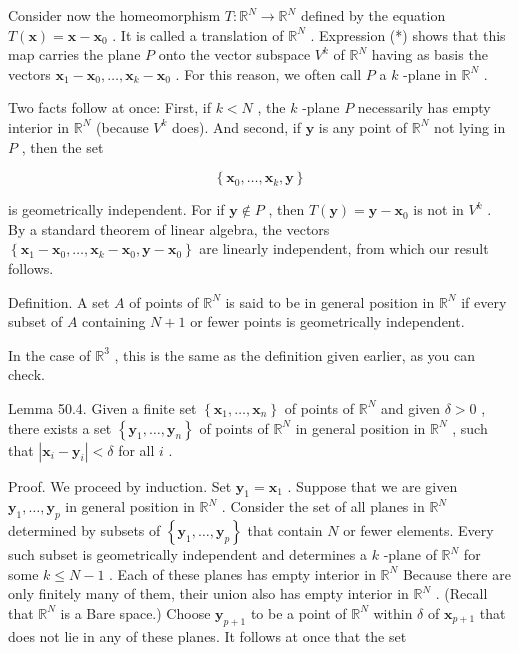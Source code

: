 Consider now the homeomorphism \(T : {\mathbb{R}}^{N} \rightarrow  {\mathbb{R}}^{N}\) defined by the equation \(T\left( \mathbf{x}\right)  = \mathbf{x} - {\mathbf{x}}_{0}\) . It is called a translation of \({\mathbb{R}}^{N}\) . Expression (*) shows that this map carries the plane \(P\) onto the vector subspace \({V}^{k}\) of \({\mathbb{R}}^{N}\) having as basis the vectors \({\mathbf{x}}_{1} - {\mathbf{x}}_{0},\ldots ,{\mathbf{x}}_{k} - {\mathbf{x}}_{0}\) . For this reason, we often call \(P\) a \(k\) -plane in \({\mathbb{R}}^{N}\) .

Two facts follow at once: First, if \(k < N\) , the \(k\) -plane \(P\) necessarily has empty interior in \({\mathbb{R}}^{N}\) (because \({V}^{k}\) does). And second, if \(\mathbf{y}\) is any point of \({\mathbb{R}}^{N}\) not lying in \(P\) , then the set

\[
\left\{  {{\mathbf{x}}_{0},\ldots ,{\mathbf{x}}_{k},\mathbf{y}}\right\}
\]

is geometrically independent. For if \(\mathbf{y} \notin  P\) , then \(T\left( \mathbf{y}\right)  = \mathbf{y} - {\mathbf{x}}_{0}\) is not in \({V}^{k}\) . By a standard theorem of linear algebra, the vectors \(\left\{  {{\mathbf{x}}_{1} - {\mathbf{x}}_{0},\ldots ,{\mathbf{x}}_{k} - {\mathbf{x}}_{0},\mathbf{y} - {\mathbf{x}}_{0}}\right\}\) are linearly independent, from which our result follows.

Definition. A set \(A\) of points of \({\mathbb{R}}^{N}\) is said to be in general position in \({\mathbb{R}}^{N}\) if every subset of \(A\) containing \(N + 1\) or fewer points is geometrically independent.

In the case of \({\mathbb{R}}^{3}\) , this is the same as the definition given earlier, as you can check.

Lemma 50.4. Given a finite set \(\left\{  {{\mathbf{x}}_{1},\ldots ,{\mathbf{x}}_{n}}\right\}\) of points of \({\mathbb{R}}^{N}\) and given \(\delta  > 0\) , there exists a set \(\left\{  {{\mathbf{y}}_{1},\ldots ,{\mathbf{y}}_{n}}\right\}\) of points of \({\mathbb{R}}^{N}\) in general position in \({\mathbb{R}}^{N}\) , such that \(\left| {{\mathbf{x}}_{i} - {\mathbf{y}}_{i}}\right|  < \delta\) for all \(i\) .

Proof. We proceed by induction. Set \({\mathbf{y}}_{1} = {\mathbf{x}}_{1}\) . Suppose that we are given \({\mathbf{y}}_{1},\ldots ,{\mathbf{y}}_{p}\) in general position in \({\mathbb{R}}^{N}\) . Consider the set of all planes in \({\mathbb{R}}^{N}\) determined by subsets of \(\left\{  {{\mathbf{y}}_{1},\ldots ,{\mathbf{y}}_{p}}\right\}\) that contain \(N\) or fewer elements. Every such subset is geometrically independent and determines a \(k\) -plane of \({\mathbb{R}}^{N}\) for some \(k \leq  N - 1\) . Each of these planes has empty interior in \({\mathbb{R}}^{N}\) Because there are only finitely many of them, their union also has empty interior in \({\mathbb{R}}^{N}\) . (Recall that \({\mathbb{R}}^{N}\) is a Bare space.) Choose \({\mathbf{y}}_{p + 1}\) to be a point of \({\mathbb{R}}^{N}\) within \(\delta\) of \({\mathbf{x}}_{p + 1}\) that does not lie in any of these planes. It follows at once that the set

